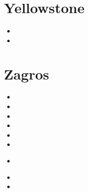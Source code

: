 \section{Yellowstone}

\begin{small}
\begin{itemize}
\item[\twothousandthirteen]
\item[\twothousandeighteen]
\end{itemize}
\end{small}

\section{Zagros} 

\begin{small}
\begin{itemize}
\item[\nineteenninetyseven]
\item[\twothousandfive]
\item[\twothousandsix]
\item[\twothousandten]
\item[\twothousandeleven]
\item[\twothousandthirteen]
\item[\twothousandfourteen]
  \\
\item[\twothousandsixteen]
\item[\twothousandseventeen]
\end{itemize}
\end{small}


